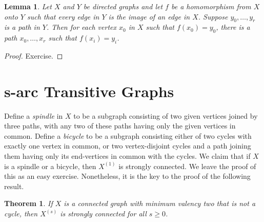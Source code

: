 \documentclass[12pt,a4paper,openany]{book}
\newtheorem{theorem}{Theorem}[section]
\newtheorem{lemma}{Lemma}[section]
\begin{document}
\begin{lemma}
Let $X$ and $Y$ be directed graphs and let $f$ be a homomorphism from $X$ onto $Y$ such that every edge in $Y$ is the image of an edge in $X$. Suppose $y_0, \dots, y_r$ is a path in $Y$. Then for each vertex $x_0$ in $X$ such that $f(x_0) = y_0$, there is a path $x_0, \dots, x_r$ such that $f(x_i) = y_i$.
\end{lemma}

\begin{proof}
Exercise.
\end{proof}

\section{ s-arc Transitive Graphs}

Define a \emph{spindle} in $X$ to be a subgraph consisting of two given vertices joined by three paths, with any two of these paths having only the given vertices in common. Define a \emph{bicycle} to be a subgraph consisting either of two cycles with exactly one vertex in common, or two vertex-disjoint cycles and a path joining them having only its end-vertices in common with the cycles. We claim that if $X$ is a spindle or a bicycle, then $X^{(1)}$ is strongly connected. We leave the proof of this as an easy exercise. Nonetheless, it is the key to the proof of the following result.

\begin{theorem}
If $X$ is a connected graph with minimum valency two that is not a cycle, then $X^{(s)}$ is strongly connected for all $s \geq 0$.
\end{theorem}
\end{document}
